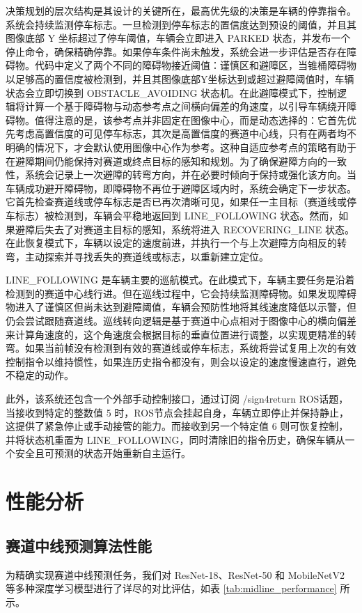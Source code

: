 \documentclass[UTF8]{ctexart}
\begin{document}
决策规划的层次结构是其设计的关键所在，最高优先级的决策是车辆的停靠指令。系统会持续监测停车标志。一旦检测到停车标志的置信度达到预设的阈值，并且其图像底部 Y 坐标超过了停车阈值，车辆会立即进入 PARKED 状态，并发布一个停止命令，确保精确停靠。如果停车条件尚未触发，系统会进一步评估是否存在障碍物。代码中定义了两个不同的障碍物接近阈值：谨慎区和避障区，当锥桶障碍物以足够高的置信度被检测到，并且其图像底部Y坐标达到或超过避障阈值时，车辆状态会立即切换到 OBSTACLE\_AVOIDING 状态机。在此避障模式下，控制逻辑将计算一个基于障碍物与动态参考点之间横向偏差的角速度，以引导车辆绕开障碍物。值得注意的是，该参考点并非固定在图像中心，而是动态选择的：它首先优先考虑高置信度的可见停车标志，其次是高置信度的赛道中心线，只有在两者均不明确的情况下，才会默认使用图像中心作为参考。这种自适应参考点的策略有助于在避障期间仍能保持对赛道或终点目标的感知和规划。为了确保避障方向的一致性，系统会记录上一次避障的转弯方向，并在必要时倾向于保持或强化该方向。当车辆成功避开障碍物，即障碍物不再位于避障区域内时，系统会确定下一步状态。它首先检查赛道线或停车标志是否已再次清晰可见，如果任一主目标（赛道线或停车标志）被检测到，车辆会平稳地返回到 LINE\_FOLLOWING 状态。然而，如果避障后失去了对赛道主目标的感知，系统将进入 RECOVERING\_LINE 状态。在此恢复模式下，车辆以设定的速度前进，并执行一个与上次避障方向相反的转弯，主动探索并寻找丢失的赛道线或标志，以重新建立定位。

LINE\_FOLLOWING 是车辆主要的巡航模式。在此模式下，车辆主要任务是沿着检测到的赛道中心线行进。但在巡线过程中，它会持续监测障碍物。如果发现障碍物进入了谨慎区但尚未达到避障阈值，车辆会预防性地将其线速度降低以示警，但仍会尝试跟随赛道线。巡线转向逻辑是基于赛道中心点相对于图像中心的横向偏差来计算角速度的，这个角速度会根据目标的垂直位置进行调整，以实现更精准的转弯。如果当前帧没有检测到有效的赛道线或停车标志，系统将尝试复用上次的有效控制指令以维持惯性，如果连历史指令都没有，则会以设定的速度慢速直行，避免不稳定的动作。

此外，该系统还包含一个外部手动控制接口，通过订阅 /sign4return ROS话题，当接收到特定的整数值 5 时，ROS节点会挂起自身，车辆立即停止并保持静止，这提供了紧急停止或手动接管的能力。而接收到另一个特定值 6 则可恢复控制，并将状态机重置为 LINE\_FOLLOWING，同时清除旧的指令历史，确保车辆从一个安全且可预测的状态开始重新自主运行。

\section{性能分析}

\subsection{赛道中线预测算法性能}
为精确实现赛道中线预测任务，我们对 ResNet-18、ResNet-50 和 MobileNetV2 \cite{sandlerMobileNetV2InvertedResiduals2019}等多种深度学习模型进行了详尽的对比评估，如表 \ref{tab:midline_performance} 所示。
\end{document}
